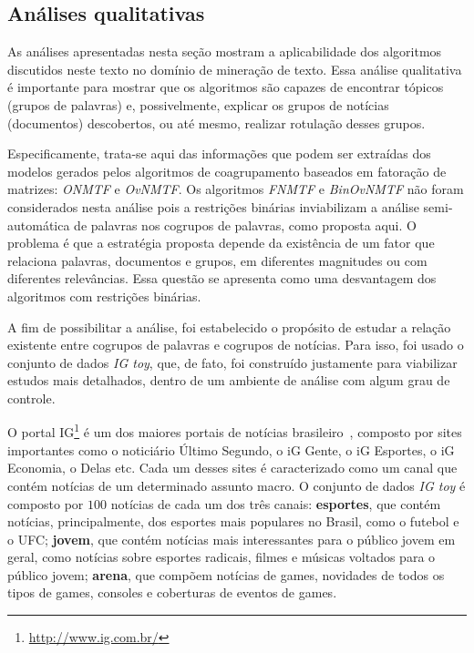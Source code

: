 \documentclass[
    12pt,                %
    oneside,            %
    a4paper,            %
    english,            %
    brazil                %
    ]{abntex2ppgsi}
\begin{document}
\subsection{Análises qualitativas}

As análises apresentadas nesta seção mostram a aplicabilidade dos algoritmos discutidos neste texto no domínio de mineração de texto. Essa análise qualitativa é importante para mostrar que os algoritmos são capazes de encontrar tópicos (grupos de palavras) e, possivelmente, explicar os grupos de notícias (documentos) descobertos, ou até mesmo, realizar rotulação desses grupos.

Especificamente, trata-se aqui das informações que podem ser extraídas dos modelos gerados pelos algoritmos de coagrupamento baseados em fatoração de matrizes: \textit{ONMTF} e \textit{OvNMTF}. Os algoritmos \textit{FNMTF} e \textit{BinOvNMTF} não foram considerados nesta análise pois a restrições binárias inviabilizam a análise semi-automática de palavras nos cogrupos de palavras, como proposta aqui. O problema é que a estratégia proposta depende da existência de um fator que relaciona palavras, documentos e grupos, em diferentes magnitudes ou com diferentes relevâncias. Essa questão se apresenta como uma desvantagem dos algoritmos com restrições binárias.

A fim de possibilitar a análise, foi estabelecido o propósito de estudar a relação existente entre cogrupos de palavras e cogrupos de notícias. Para isso, foi usado o conjunto de dados \textit{IG toy}, que, de fato, foi construído justamente para viabilizar estudos mais detalhados, dentro de um ambiente de análise com algum grau de controle.

O portal IG\footnote{\url{http://www.ig.com.br/}} é um dos maiores portais de notícias brasileiro~\cite{topsites}, composto por sites importantes como o noticiário Último Segundo, o iG Gente, o iG Esportes, o iG Economia, o Delas etc. Cada um desses sites é caracterizado como um canal que contém notícias de um determinado assunto macro. O conjunto de dados \textit{IG toy} é composto por $100$ notícias de cada um dos três canais: \textbf{esportes}, que contém notícias, principalmente, dos esportes mais populares no Brasil, como o futebol e o UFC; \textbf{jovem}, que contém notícias mais interessantes para o público jovem em geral, como notícias sobre esportes radicais, filmes e músicas voltados para o público jovem; \textbf{arena}, que compõem notícias de games, novidades de todos os tipos de games, consoles e coberturas de eventos de games.
\end{document}
